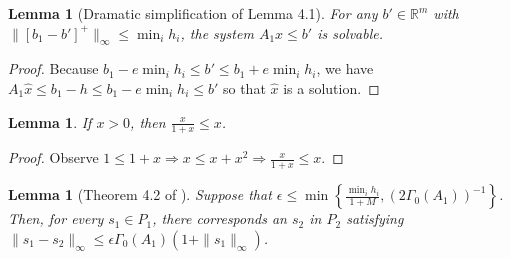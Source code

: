 \documentclass{article}
\newtheorem{lemma}[theorem]{Lemma}
\theoremstyle{case}
\numberwithin{theorem}{subsection}
\newcommand{\huff}{{\Gamma_0}}
\newcommand{\Rm}{\mathbb R^m}
\begin{document}
\color{black}


% 








\begin{lemma}[Dramatic simplification of Lemma 4.1]
\label{4_1}
For any $b' \in \Rm$ with $\|\left[b_1 - b'\right]^+\|_{\infty} \le \min_i h_i$, the system $A_1x \le b'$ is solvable.
\end{lemma}

\begin{proof}
Because $b_1 - e \min_i h_i \le b' \le b_1 + e \min_i h_i$, we have $A_1\hat x\le b_1 - h\le b_1 - e \min_i h_i \le b'$ so that $\hat x$ is a solution.
\end{proof}


\begin{lemma}
\label{simple_bound}
If $x > 0$, then $\frac {x}{1+x} \le x$.
\end{lemma}
\begin{proof}
Observe $1 \le 1 + x\Longrightarrow x \le x + x^2 \Longrightarrow \frac {x}{1+x} \le x$.
\end{proof}




\begin{lemma}[Theorem 4.2 of \cite{dummy:perturbations}]
\label{4_2}
Suppose that $\epsilon\le \min\left\{\frac{\min_i h_i}{1 + M},\left(2\huff(A_1)\right)^{-1}\right\}$.
Then, for every $s_1 \in P_1$,
there corresponds an $s_2$ in $P_2$ satisfying 
$\|s_1 - s_2\|_{\infty}\le \epsilon\huff(A_1)\left(1 + \|s_1\|_{\infty}\right)$.
\end{lemma}
\end{document}
